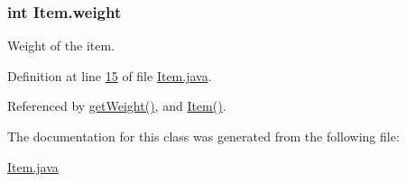 \hypertarget{classItem_ade554833393860faaece5e514637b5d0}{
\subsubsection[{weight}]{\setlength{\rightskip}{0pt plus 5cm}int Item.\-weight\hspace{0.3cm}{\ttfamily [private]}}}\label{classItem_ade554833393860faaece5e514637b5d0}
Weight of the item. 

Definition at line \hyperlink{Item_8java_source_l00015}{15} of file \hyperlink{Item_8java_source}{Item.\-java}.



Referenced by \hyperlink{Item_8java_source_l00043}{get\-Weight()}, and \hyperlink{Item_8java_source_l00027}{Item()}.



The documentation for this class was generated from the following file\-:\begin{DoxyCompactItemize}
\item 
\hyperlink{Item_8java}{Item.\-java}\end{DoxyCompactItemize}
